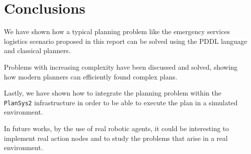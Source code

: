 \section{Conclusions}
\label{sec5}

We have shown how a typical planning problem like the emergency services logistics scenario 
proposed in this report can be solved using the PDDL language and classical planners.

Problems with increasing complexity have been discussed and solved, showing how modern planners can 
efficiently found complex plans.

Lastly, we have shown how to integrate the planning problem within the \texttt{PlanSys2} infrastructure
in order to be able to execute the plan in a simulated environment.

In future works, by the use of real robotic agents, it could be interesting to implement real action nodes
and to study the problems that arise in a real environment.


